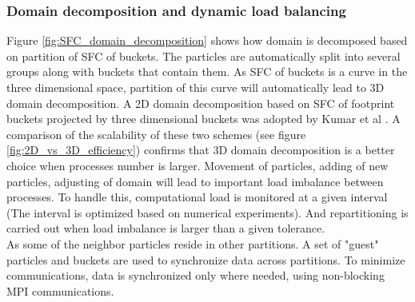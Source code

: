 \documentclass[conference,compsoc]{IEEEtran}
\begin{document}
\subsubsection{Domain decomposition and dynamic load balancing}
Figure \ref{fig:SFC_domain_decomposition} shows how domain is decomposed based on partition of SFC of buckets. The particles are automatically split into several groups along with buckets that contain them. As SFC of buckets is a curve in the three dimensional space, partition of this curve will automatically lead to 3D domain decomposition. A 2D domain decomposition based on SFC of footprint buckets projected by three dimensional buckets was adopted by Kumar et al \cite{kumar2013parallel}. A comparison of the scalability of these two schemes (see figure \ref{fig:2D_vs_3D_efficiency}) confirms that 3D domain decomposition is a better choice when processes number is larger. 
Movement of particles, adding of new particles, adjusting of domain will lead to important load imbalance between processes. To handle this, computational load is monitored at a given interval (The interval is optimized based on numerical experiments). And repartitioning is carried out when load imbalance is larger than a given tolerance.
\\
As some of the neighbor particles reside in other partitions. A set of "guest" particles and buckets are used to synchronize data across partitions. To minimize communications, data is synchronized only where needed, using non-blocking MPI communications. 
\end{document}
